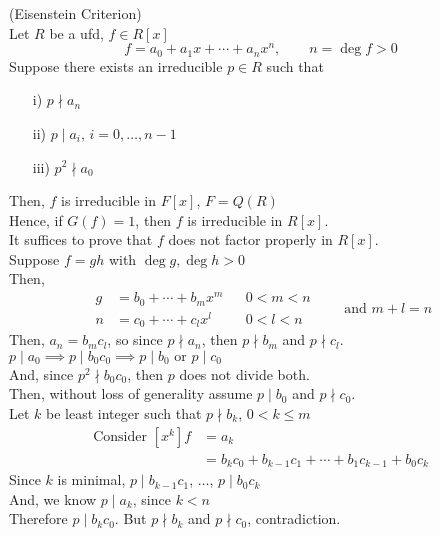 \thm (Eisenstein Criterion) \\
Let $R$ be a ufd, $f\in R[x]$
\[ f = a_0 + a_1x + \dotsb + a_nx^n, \qquad n = \deg f > 0 \]
Suppose there exists an irreducible $p\in R$ such that
\begin{enumerate}
\item[i)] $p\nmid a_n$
\item[ii)] $p\mid a_i$, $i=0,\dotsc,n-1$
\item[iii)] $p^2\nmid a_0$
\end{enumerate}
Then, $f$ is irreducible in $F[x]$, $F=Q(R)$ \\
Hence, if $G(f)=1$, then $f$ is irreducible in $R[x]$. \\
\pf It suffices to prove that $f$ does not factor properly in $R[x]$. \\
Suppose $f=gh$ with $\deg g,\deg h>0$ \\
Then,
\[ \begin{aligned}g&=b_0+\dotsb+b_mx^m&&0<m<n\\n&=c_0+\dotsb+c_lx^l&&0<l<n\end{aligned} \qquad\text{and $m+l=n$} \]
Then, $a_n=b_mc_l$, so since $p\nmid a_n$, then $p\nmid b_m$ and $p\nmid c_l$. \\
$p\mid a_0 \implies p\mid b_0c_0 \implies p\mid b_0 \text{ or } p\mid c_0$ \\
And, since $p^2\nmid b_0c_0$, then $p$ does not divide both. \\
Then, without loss of generality assume $p\mid b_0$ and $p\nmid c_0$. \\
Let $k$ be least integer such that $p\nmid b_k$, $0<k\leq m$
\begin{align*}
\text{Consider } [x^k] f &= a_k \\
&= b_kc_0 + b_{k-1}c_1 + \dotsb + b_1c_{k-1} + b_0c_k
\end{align*}
Since $k$ is minimal, $p\mid b_{k-1}c_1$, $\dotsc$, $p\mid b_0c_k$ \\
And, we know $p\mid a_k$, since $k<n$ \\
Therefore $p\mid b_kc_0$.  But $p\nmid b_k$ and $p\nmid c_0$, contradiction.

